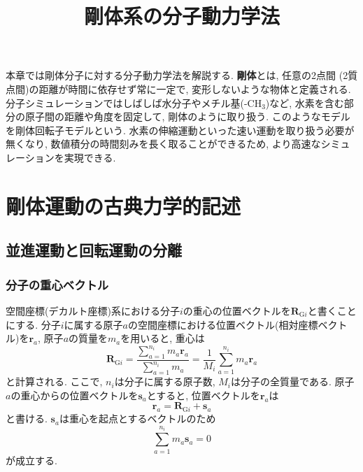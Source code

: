 





\title{剛体系の分子動力学法}
\maketitle
本章では剛体分子に対する分子動力学法を解説する.
\textbf{剛体}とは, 任意の2点間 (2質点間)の距離が時間に依存せず常に一定で, 変形しないような物体と定義される.
分子シミュレーションではしばしば水分子やメチル基(-CH$_{3}$)など, 水素を含む部分の原子間の距離や角度を固定して, 剛体のように取り扱う.
このようなモデルを剛体回転子モデルという.
水素の伸縮運動といった速い運動を取り扱う必要が無くなり, 数値積分の時間刻みを長く取ることができるため,
より高速なシミュレーションを実現できる.

\section{剛体運動の古典力学的記述}

\subsection{並進運動と回転運動の分離}
\subsubsection{分子の重心ベクトル}

空間座標(デカルト座標)系における分子$i$の重心の位置ベクトルを$\bm{R}_{\mathrm{G}i}$と書くことにする.
分子$i$に属する原子$a$の空間座標における位置ベクトル(相対座標ベクトル)を$\bm{r}_{a}$, 原子$a$の質量を$m_{a}$を用いると, 重心は
\begin{equation}
  \bm{R}_{\mathrm{G}i}
  =
  \frac{\sum_{a=1}^{n_{i}} m_{a} \bm{r}_{a}}{\sum_{a=1}^{n_{i}} m_{a}}
  =
  \frac{1}{M_{i}}
  \sum_{a=1}^{n_{i}} m_{a} \bm{r}_{a}
  \label{Eq:Vector_CoM}
\end{equation}
と計算される. ここで, $n_{i}$は分子に属する原子数, $M_{i}$は分子の全質量である.
原子$a$の重心からの位置ベクトルを$\bm{s}_{a}$とすると, 位置ベクトルを$\bm{r}_{a}$は
\begin{equation}
  \bm{r}_{a} = \bm{R}_{\mathrm{G}i} + \bm{s}_{a}
  \label{Eq:Vector_AtomPosition}
\end{equation}
と書ける. $\bm{s}_{a}$は重心を起点とするベクトルのため
\begin{equation}
  \sum_{a=1}^{n_{i}} m_{a} \bm{s}_{a} = 0
  \label{Eq:IEq_SiteVector}
\end{equation}
が成立する.




